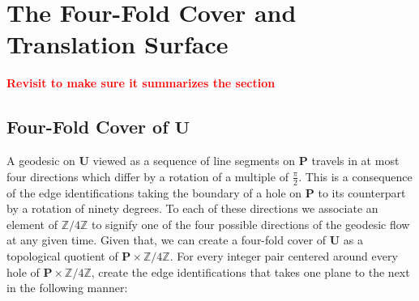 \documentclass[]{article}
\newcommand{\compat}[1]{\textbf{\textcolor{red}{#1}}}
\begin{document}
%
%	
%	
%			
\section{The Four-Fold Cover and Translation Surface}
\compat{Revisit to make sure it summarizes the section}


\subsection{Four-Fold Cover of $\mathbf{U}$}
A geodesic on $\mathbf{U}$ viewed as a sequence of line segments on $\mathbf{P}$ travels in at most four directions which differ by a rotation of a multiple of $\frac{\pi}{2}$. This is a consequence of the edge identifications taking the boundary of a hole on $\mathbf{P}$ to its counterpart by a rotation of ninety degrees. To each of these directions we associate an element of $\mathbb{Z}/4\mathbb{Z}$ to signify one of the four possible directions of the geodesic flow at any given time. Given that, we can create a four-fold cover of $\mathbf{U}$ as a topological quotient of $\mathbf{P}\times\mathbb{Z}/4\mathbb{Z}$. For every integer pair centered around every hole of $\mathbf{P}\times\mathbb{Z}/4\mathbb{Z}$, create the edge identifications that takes one plane to the next in the following manner:
\end{document}
